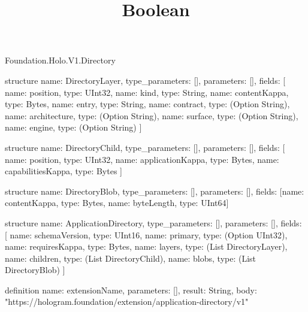 \begin{lexlean}{Foundation.Holo.V1.Directory}
\title{Boolean}
\begin{semanticmodule}
structure{
  name: DirectoryLayer,
  type_parameters: [],
  parameters: [],
  fields: [
    {name: position, type: UInt32},
    {name: kind, type: String},
    {name: contentKappa, type: Bytes},
    {name: entry, type: String},
    {name: contract, type: (Option String)},
    {name: architecture, type: (Option String)},
    {name: surface, type: (Option String)},
    {name: engine, type: (Option String)}
  ]
}

structure{
  name: DirectoryChild,
  type_parameters: [],
  parameters: [],
  fields: [
    {name: position, type: UInt32},
    {name: applicationKappa, type: Bytes},
    {name: capabilitiesKappa, type: Bytes}
  ]
}

structure{
  name: DirectoryBlob,
  type_parameters: [],
  parameters: [],
  fields: [{name: contentKappa, type: Bytes}, {name: byteLength, type: UInt64}]
}

structure{
  name: ApplicationDirectory,
  type_parameters: [],
  parameters: [],
  fields: [
    {name: schemaVersion, type: UInt16},
    {name: primary, type: (Option UInt32)},
    {name: requiresKappa, type: Bytes},
    {name: layers, type: (List DirectoryLayer)},
    {name: children, type: (List DirectoryChild)},
    {name: blobs, type: (List DirectoryBlob)}
  ]
}

definition{
  name: extensionName,
  parameters: [],
  result: String,
  body: "https://hologram.foundation/extension/application-directory/v1"
}
\end{semanticmodule}
\end{lexlean}
